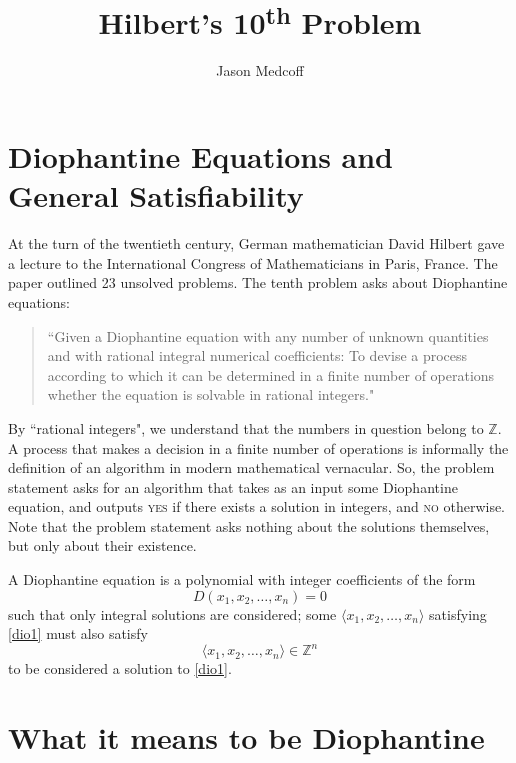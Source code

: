 \documentclass[12pt]{amsart}
\title{Hilbert's 10\textsuperscript{th} Problem}
\author{Jason Medcoff}
\theoremstyle{definition}
\theoremstyle{case}
\begin{document}
	\maketitle
	
	
	
	\section{Diophantine Equations and General Satisfiability}
	
	At the turn of the twentieth century, German mathematician David Hilbert gave a lecture to the International Congress of Mathematicians in Paris, France. The paper outlined 23 unsolved problems. The tenth problem asks about Diophantine equations:
	\begin{quotation}
		``Given a Diophantine equation with any number of unknown quantities and with rational integral numerical coefficients: To devise a process according to which it can be determined in a finite number of operations whether the equation is solvable in rational integers."
	\end{quotation}
	By ``rational integers", we understand that the numbers in question belong to $\mathbb{Z}$. A process that makes a decision in a finite number of operations is informally the definition of an algorithm in modern mathematical vernacular. So, the problem statement asks for an algorithm that takes as an input some Diophantine equation, and outputs \textsc{yes} if there exists a solution in integers, and \textsc{no} otherwise. Note that the problem statement asks nothing about the solutions themselves, but only about their existence.
	
	A Diophantine equation is a polynomial with integer coefficients of the form
	\begin{equation} \label{dio1}
	D(x_1, x_2, \dots, x_n) = 0
	\end{equation} 
	such that only integral solutions are considered; some $\langle x_1, x_2, \dots, x_n \rangle$ satisfying \eqref{dio1} must also satisfy
	$$\langle x_1, x_2, \dots, x_n \rangle \in \mathbb{Z}^n $$
	to be considered a solution to \eqref{dio1}.
	
	
	\section{What it means to be Diophantine}
	
\end{document}
